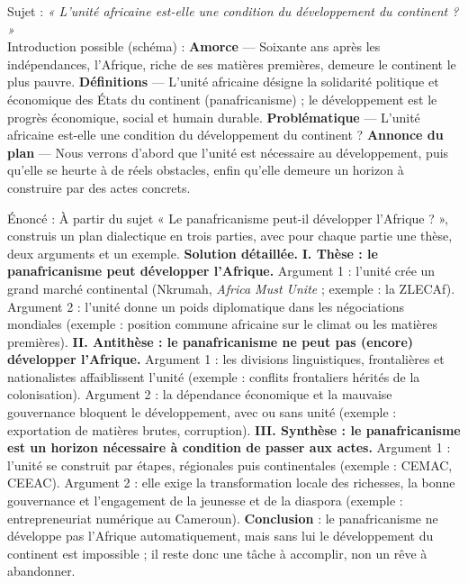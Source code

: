 \documentclass[11pt]{article}
\begin{document}
\begin{exemplebox}
Sujet : \emph{« L'unité africaine est-elle une condition du développement du continent ? »}\\
Introduction possible (schéma) : \textbf{Amorce} — Soixante ans après les indépendances, l'Afrique, riche de ses matières premières, demeure le continent le plus pauvre. \textbf{Définitions} — L'unité africaine désigne la solidarité politique et économique des États du continent (panafricanisme) ; le développement est le progrès économique, social et humain durable. \textbf{Problématique} — L'unité africaine est-elle une condition du développement du continent ? \textbf{Annonce du plan} — Nous verrons d'abord que l'unité est nécessaire au développement, puis qu'elle se heurte à de réels obstacles, enfin qu'elle demeure un horizon à construire par des actes concrets.
\end{exemplebox}

\begin{exoresolu}
Énoncé : À partir du sujet « Le panafricanisme peut-il développer l'Afrique ? », construis un plan dialectique en trois parties, avec pour chaque partie une thèse, deux arguments et un exemple.
\tcblower
\textbf{Solution détaillée.}
\textbf{I. Thèse : le panafricanisme peut développer l'Afrique.} Argument 1 : l'unité crée un grand marché continental (Nkrumah, \emph{Africa Must Unite} ; exemple : la ZLECAf). Argument 2 : l'unité donne un poids diplomatique dans les négociations mondiales (exemple : position commune africaine sur le climat ou les matières premières).
\textbf{II. Antithèse : le panafricanisme ne peut pas (encore) développer l'Afrique.} Argument 1 : les divisions linguistiques, frontalières et nationalistes affaiblissent l'unité (exemple : conflits frontaliers hérités de la colonisation). Argument 2 : la dépendance économique et la mauvaise gouvernance bloquent le développement, avec ou sans unité (exemple : exportation de matières brutes, corruption).
\textbf{III. Synthèse : le panafricanisme est un horizon nécessaire à condition de passer aux actes.} Argument 1 : l'unité se construit par étapes, régionales puis continentales (exemple : CEMAC, CEEAC). Argument 2 : elle exige la transformation locale des richesses, la bonne gouvernance et l'engagement de la jeunesse et de la diaspora (exemple : entrepreneuriat numérique au Cameroun).
\textbf{Conclusion} : le panafricanisme ne développe pas l'Afrique automatiquement, mais sans lui le développement du continent est impossible ; il reste donc une tâche à accomplir, non un rêve à abandonner.
\end{exoresolu}
\end{document}
